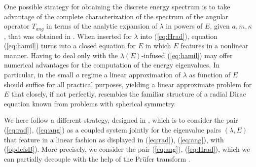 \documentclass[11 pt]{article}
\renewcommand\({\left(}
\renewcommand\){\right)}
\newcommand\<{\langle}
\renewcommand\>{\rangle}
\newcommand\8{\infty}
\newcommand{\la} {\lambda}\newcommand{\La}{\Lambda}
\begin{document}
   One possible strategy for obtaining the discrete energy spectrum is to take advantage of 
the complete characterization of the spectrum of the angular operator $T_{ang}$ in terms of the analytic expansion of $\la$ in powers of $E$,
   given $a,m,\kappa$, that was obtained in \cite{BSW}.
  When inserted for $\la$ into (\ref{eq:Hrad}), equation (\ref{eq:hamil}) turns into a closed equation for $E$ in which $E$ features in a 
  nonlinear manner. 
   Having to deal only with the $\la(E)$-infused (\ref{eq:hamil})  may offer numerical advantages for the computation of the energy eigenvalues. 
    In particular, in the small $a$ regime a linear approximation of $\lambda$ as function of $E$ should suffice for all practical purposes, 
   yielding a linear approximate problem for $E$ that closely, if not perfectly, resembles the familiar structure of a radial Dirac equation known 
   from problems with spherical symmetry. 
   
   We here follow a different strategy, designed in \cite{KTZzGKNDa}, which is to consider the pair (\ref{eq:rad}), (\ref{eq:ang}) as a coupled system 
  jointly for the eigenvalue pairs $(\la,E)$ that feature in a linear fashion as displayed in  (\ref{eq:rad}), (\ref{eq:ang}), with (\ref{opdefsB}).
   More precisely, we consider the pair  (\ref{eq:ang}), (\ref{eq:Hrad}), which we can partially decouple with the help of the Pr\"ufer transform \cite{Pru26}.


\end{document}
